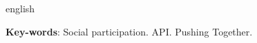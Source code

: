 \begin{resumo}[Abstract]
 \begin{otherlanguage*}{english}
  
   \vspace{\onelineskip}
 
   \noindent 
   \textbf{Key-words}: Social participation. API. Pushing Together.
 \end{otherlanguage*}
\end{resumo}
